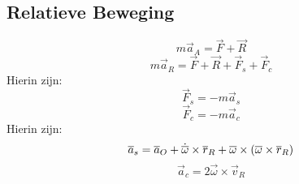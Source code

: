 \subsection{Relatieve Beweging}
\[
  m \vec{a}_A = \vec{F} + \vec{R}
\]
\[
  m \vec{a}_R = \vec{F} + \vec{R} + \vec{F}_s + \vec{F}_c
\]
Hierin zijn:
\[
  \vec{F}_s = - m \vec{a}_s
\]
\[
  \vec{F}_c = - m \vec{a}_c
\]
Hierin zijn:
\[
  \overline{a}_s = \overline{a}_O + \dot{\overline{\omega}} \times \overline{r}_R + \overline{\omega} \times \left( \overline{\omega} \times \overline{r}_R \right)
\]
\[
  \vec{a}_c = 2 \vec{\omega} \times \vec{v}_R
\]





